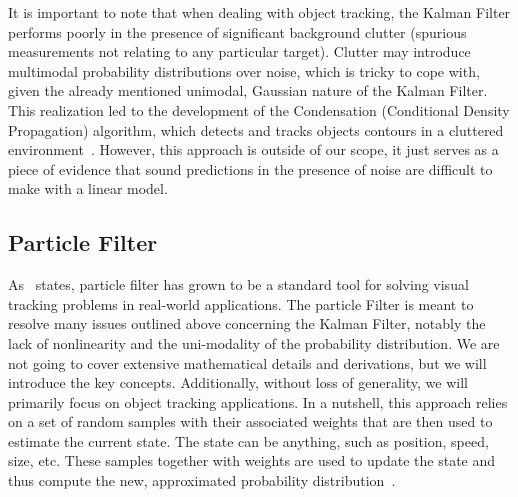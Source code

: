 It is important to note that when dealing with object tracking, the Kalman Filter performs poorly in the presence of significant background clutter (spurious measurements not relating to any particular target). Clutter may introduce multimodal probability distributions over noise, which is tricky to cope with, given the already mentioned unimodal, Gaussian nature of the Kalman Filter. This realization led to the development of the Condensation (Conditional Density Propagation) algorithm, which detects and tracks objects contours in a cluttered environment~\cite{isard1998condensation}. However, this approach is outside of our scope, it just serves as a piece of evidence that sound predictions in the presence of noise are difficult to make with a linear model.

\subsection{Particle Filter}
\label{ssec:ParticleFilter}

As~\cite{wang2011particlevot} states, particle filter has grown to be a standard tool for solving visual tracking problems in real-world applications. The particle Filter is meant to resolve many issues outlined above concerning the Kalman Filter, notably the lack of nonlinearity and the uni-modality of the probability distribution. We are not going to cover extensive mathematical details and derivations, but we will introduce the key concepts. Additionally, without loss of generality, we will primarily focus on object tracking applications. In a nutshell, this approach relies on a set of random samples with their associated weights that are then used to estimate the current state. The state can be anything, such as position, speed, size, etc. These samples together with weights are used to update the state and thus compute the new, approximated probability distribution~\cite{welch1995introduction}.

